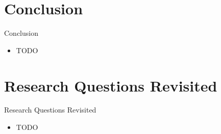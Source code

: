 \documentclass{beamer}
\begin{document}
\section{Conclusion}


\begin{frame}{Conclusion}

\begin{itemize}
  \item TODO
\end{itemize}

\end{frame}


\section{Research Questions Revisited}


\begin{frame}{Research Questions Revisited}

\begin{itemize}
  \item TODO
\end{itemize}

\end{frame}

\end{document}

